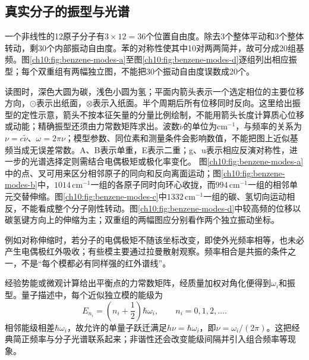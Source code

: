 \subsection{真实分子的振型与光谱}
一个非线性的12原子分子有$3\times12=36$个位置自由度。除去3个整体平动和3个整体转动，剩30个内部振动自由度。苯的对称性使其中10对两两简并，故可分成20组基频。图\ref{ch10:fig:benzene-modes-a}至图\ref{ch10:fig:benzene-modes-d}逐组列出相应振型；每个双重组有两幅独立图，不能把30个振动自由度误数成20个。

读图时，深色大圆为碳，浅色小圆为氢；平面内箭头表示一个选定相位的主要位移方向，$\odot$表示出纸面，$\otimes$表示入纸面。半个周期后所有位移同时反向。这里给出振型的定性示意，箭头不按本征矢量的分量比例绘制，不能用箭头长度计算质心位移或动能；精确振型还须由力常数矩阵求出。波数$\widetilde\nu$的单位为$\mathrm{cm^{-1}}$，与频率的关系为$\nu=c\widetilde\nu$、$\omega=2\pi\nu$；模型参数、同位素和测量条件会影响数值，不能把图上近似基频当成无误差常数。A、B表示单重，E表示二重；g、u表示相应反演对称性，进一步的光谱选择定则需结合电偶极矩或极化率变化。
图\ref{ch10:fig:benzene-modes-a}中的点、叉可用来区分相邻原子的同向和反向离面运动；图\ref{ch10:fig:benzene-modes-b}中，$1014\,\mathrm{cm^{-1}}$一组的各原子同时向环心收拢，而$994\,\mathrm{cm^{-1}}$一组的相邻单元交替伸缩。图\ref{ch10:fig:benzene-modes-c}中$1332\,\mathrm{cm^{-1}}$一组的碳、氢切向运动相反，不能看成整个分子刚性转动。图\ref{ch10:fig:benzene-modes-d}中较高频的位移以碳氢键方向上的伸缩为主；双重组的两幅图应分别看作两个独立振动坐标。

例如对称伸缩时，若分子的电偶极矩不随该坐标改变，即使外光频率相等，也未必产生电偶极红外吸收；有些模主要通过拉曼散射观察。频率相合是共振的条件之一，不是“每个模都必有同样强的红外谱线”。

经验势能或微观计算给出平衡点的力常数矩阵，经质量加权对角化便得到$\omega_i$和振型。量子描述中，每个近似独立模的能级为
\[
 E_{n_i}=\left(n_i+\frac12\right)\hbar\omega_i,\qquad n_i=0,1,2,\ldots.
\]
相邻能级相差$\hbar\omega_i$，故允许的单量子跃迁满足$h\nu=\hbar\omega_i$，即$\nu=\omega_i/(2\pi)$。这把经典简正频率与分子光谱联系起来；非谐性还会改变能级间隔并引入组合频率等现象。

